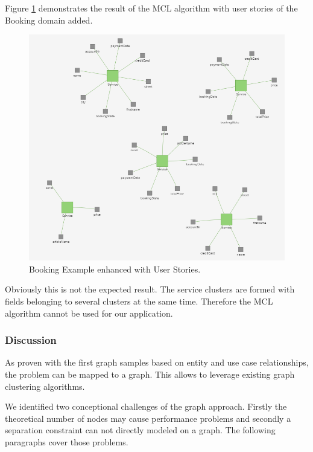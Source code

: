 Figure \ref{fig:clusteringBooking} demonstrates the result of the MCL algorithm with user stories of the Booking domain added. 

\begin{figure}[H]
	\begin{center}
		\includegraphics[scale=0.7]{images/booking_entities_mcl.png}
	\end{center}
	\caption{Booking Example enhanced with User Stories.}
	\label{fig:clusteringBooking}
\end{figure}

Obviously this is not the expected result. The service clusters are formed with fields belonging to several clusters at the same time. Therefore the MCL algorithm cannot be used for our application.


\subsubsection{Discussion}

As proven with the first graph samples based on entity and use case relationships, the problem can be mapped to a graph. This allows to leverage existing graph clustering algorithms.

We identified two conceptional challenges of the graph approach. Firstly the theoretical number of nodes may cause performance problems and secondly a separation constraint can not directly modeled on a graph. The following paragraphs cover those problems.

